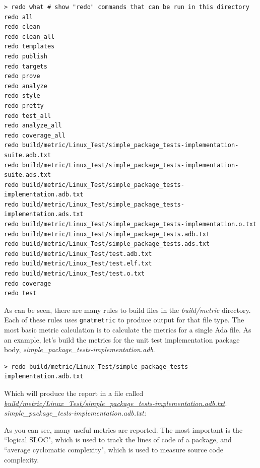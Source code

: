 \vspace{5mm} %
\begin{verbatim}
> redo what # show "redo" commands that can be run in this directory
redo all
redo clean
redo clean_all
redo templates
redo publish
redo targets
redo prove
redo analyze
redo style
redo pretty
redo test_all
redo analyze_all
redo coverage_all
redo build/metric/Linux_Test/simple_package_tests-implementation-suite.adb.txt
redo build/metric/Linux_Test/simple_package_tests-implementation-suite.ads.txt
redo build/metric/Linux_Test/simple_package_tests-implementation.adb.txt
redo build/metric/Linux_Test/simple_package_tests-implementation.ads.txt
redo build/metric/Linux_Test/simple_package_tests-implementation.o.txt
redo build/metric/Linux_Test/simple_package_tests.adb.txt
redo build/metric/Linux_Test/simple_package_tests.ads.txt
redo build/metric/Linux_Test/test.adb.txt
redo build/metric/Linux_Test/test.elf.txt
redo build/metric/Linux_Test/test.o.txt
redo coverage
redo test
\end{verbatim}
\vspace{5mm} %

As can be seen, there are many rules to build files in the \textit{build/metric} directory. Each of these rules uses \texttt{gnatmetric} to produce output for that file type. The most basic metric calculation is to calculate the metrics for a single Ada file. As an example, let's build the metrics for the unit test implementation package body, \textit{simple\_package\_tests-implementation.adb}.

\vspace{5mm} %
\begin{verbatim}
> redo build/metric/Linux_Test/simple_package_tests-implementation.adb.txt
\end{verbatim}
\vspace{5mm} %

Which will produce the report in a file called \textit{\url{build/metric/Linux\_Test/simple\_package\_tests-implementation.adb.txt}}. \\

\textit{simple\_package\_tests-implementation.adb.txt:}

As you can see, many useful metrics are reported. The most important is the ``logical SLOC", which is used to track the lines of code of a package, and ``average cyclomatic complexity", which is used to measure source code complexity. \\

